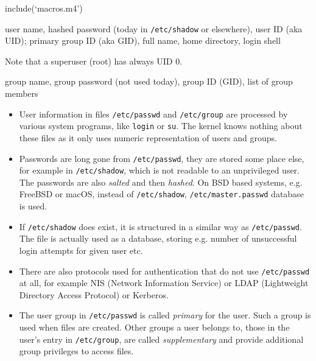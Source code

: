 include(`macros.m4')

\pagebreak
{}

\begin{slide}
\end{slide}

\begin{slide}
\begin{center}
\end{center}
\vspace{2ex}

 user name,
hashed password (today in \texttt{/etc/shadow} or elsewhere), user ID (aka UID);
primary group ID (aka GID), full name, home directory, login shell

Note that a superuser (root) has always UID 0.

\vspace{2ex}
\begin{center}
\end{center}
\vspace{2ex}

 group name, group password (not
used today), group ID (GID), list of group members
\end{slide}

\begin{itemize}
\item User information in files \texttt{/etc/passwd} and \texttt{/etc/group} are
processed by various system programs, like \texttt{login} or \texttt{su}.
The kernel knows nothing about these files as it only uses numeric
representation of users and groups.
\item Passwords are long gone from \texttt{/etc/passwd}, they are stored some
place else, for example in \texttt{/etc/shadow}, which is not readable to an
unprivileged user. The passwords are also \emph{salted} and then \emph{hashed}.
On BSD based systems, e.g. FreeBSD or macOS, instead of \texttt{/etc/shadow},
\texttt{/etc/master.passwd} database is used.
\item If \texttt{/etc/shadow} does exist, it is structured in a similar way as
\texttt{/etc/passwd}. The file is actually used as a database, storing e.g.
number of unsuccessful login attempts for given user etc.
\item There are also protocols used for authentication that do not use
\texttt{/etc/passwd} at all, for example NIS (Network Information Service) or
LDAP (Lightweight Directory Access Protocol) or Kerberos.
\item The user group in \texttt{/etc/passwd} is called \emph{primary} for the
user.  Such a group is used when files are created.  Other groups a user belongs
to, those in the user's entry in \texttt{/etc/group}, are called
\emph{supplementary} and provide additional group privileges to access files.
\end{itemize}

